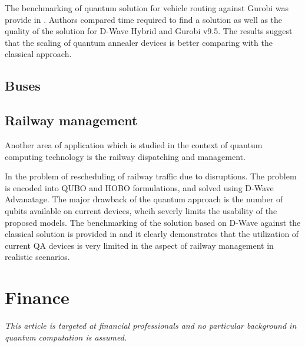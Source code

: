 \documentclass[a4paper,11pt]{article}
\begin{document}
The benchmarking of quantum solution for vehicle routing against Gurobi was provide in \cite{anil2022performance}. Authors compared time required to find a solution as well as the quality of the solution for D-Wave Hybrid and  Gurobi v9.5. The results suggest that the scaling of quantum annealer devices is better comparing with the classical approach.


\subsection{Buses}
 \cite{yarkoni2020quantum}

\subsection{Railway management}

Another area of application which is studied in the context of quantum computing technology is the railway dispatching and management.


In \cite{domino2022quadratic} the problem of rescheduling of railway traffic due to disruptions. The problem is encoded into QUBO and HOBO formulations, and solved using D-Wave Advanatage. The major drawback of the quantum approach is the number of qubits available on current devices, whcih severly limits the usability of the proposed models. The benchmarking of the solution based on D-Wave against the classical solution is provided in \cite{domino2023quantum} and it clearly demonstrates that the utilization of current QA devices is very limited in the aspect of railway management in realistic scenarios. 

\newpage 

\section{Finance}


\textit{This article is targeted at financial professionals and no particular background in quantum computation is assumed. }
\end{document}
